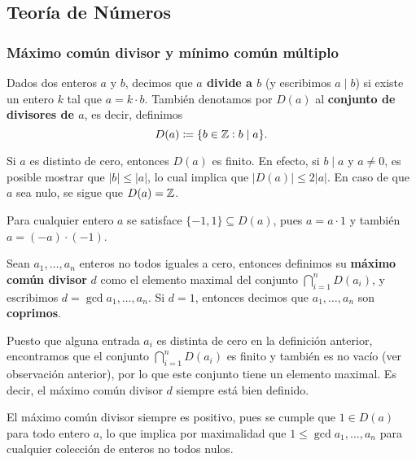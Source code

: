 \subsection{Teoría de Números}
\label{section:number-theory}
\subsubsection{Máximo común divisor y mínimo común múltiplo}
\noindent

\begin{definition}
	Dados dos enteros $a$ y $b$, decimos que \textbf{$a$ divide a $b$} (y escribimos $a \mid b$) si
	existe un entero $k$ tal que $a = k \cdot b$. También denotamos por $D(a)$ al \textbf{conjunto de
	divisores de $a$}, es decir, definimos
	\begin{equation*}
		D(a) \coloneq \lbrace b \in \mathbb{Z} \vcentcolon b \mid a \rbrace.
	\end{equation*}
\end{definition}
\begin{observation}
	Si $a$ es distinto de cero, entonces $D(a)$ es finito. En efecto, si $b \mid a$ y $a \neq 0$, es
	posible mostrar que $|b| \leq |a|$, lo cual implica que $|D(a)| \leq 2|a|$. En caso de que $a$
	sea nulo, se sigue que $D(a) = \mathbb{Z}$.
\end{observation}
\begin{observation}
	Para cualquier entero $a$ se satisface $\lbrace -1, 1 \rbrace \subseteq D(a)$, pues $a = a \cdot
	1$ y también $a = (-a) \cdot (-1)$.
\end{observation}

\begin{definition}
	\label{prerreq:def:gcd}
	Sean $a_1, \ldots, a_n$ enteros no todos iguales a cero, entonces definimos su \textbf{máximo
	común divisor} $d$ como el elemento maximal del conjunto $\bigcap_{i=1}^{n}D(a_i)$, y escribimos
	$d = \gcd{a_1, \ldots, a_n}$. Si $d = 1$, entonces decimos que $a_1, \ldots, a_n$ son
	\textbf{coprimos}.
\end{definition}

Puesto que alguna entrada $a_i$ es distinta de cero en la definición anterior, encontramos que el conjunto
$\bigcap_{i=1}^{n}D(a_i)$ es finito y también es no vacío (ver observación anterior), por lo que
este conjunto tiene un elemento maximal. Es decir, el máximo común divisor $d$ siempre está bien
definido.
\begin{observation}
	El máximo común divisor siempre es positivo, pues se cumple que $1 \in D(a)$ para todo entero
	$a$, lo que implica por maximalidad que $1 \leq \gcd{a_1, \ldots, a_n}$ para cualquier colección
	de enteros no todos nulos.
\end{observation}

